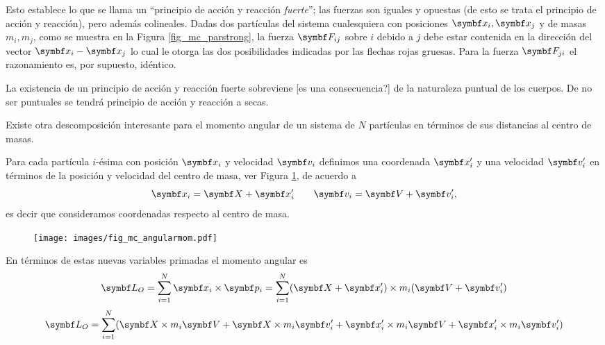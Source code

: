 \documentclass[10pt,oneside]{CBFT_book}
\begin{document}
Esto establece lo que se llama un ``principio de acción y reacción {\it fuerte}''; las fuerzas son iguales y opuestas 
(de esto se trata el principio de acción y reacción), pero además colineales.
Dadas dos partículas del sistema cualesquiera con posiciones $ \vb{x}_i, \vb{x}_j $ y de masas $ m_i, m_j $, como se 
muestra en la Figura \ref{fig_mc_parstrong}, la fuerza $\vb{F}_{ij}$ sobre $i$ debido a $j$ debe estar contenida en la 
dirección del vector $ \vb{x}_i - \vb{x}_j $ lo cual le otorga las dos posibilidades indicadas por las flechas rojas 
gruesas. Para la fuerza $\vb{F}_{ji}$ el razonamiento es, por supuesto, idéntico.


La existencia de un principio de acción y reacción fuerte sobreviene [es una consecuencia?] de la naturaleza puntual de 
los cuerpos. De no ser puntuales se tendrá principio de acción y reacción a secas.

Existe otra descomposición interesante para el momento angular  de un sistema de $N$ partículas en términos de 
sus distancias al centro de masas.

Para cada partícula $i$-ésima con posición $ \vb{x}_i $ y velocidad $ \vb{v}_i $ definimos una coordenada $ \vb{x}_i' $ 
y una velocidad $\vb{v}_i' $ en términos de la posición  y velocidad  del centro de masa, ver Figura 
\ref{fig_mc_angularmom}, de acuerdo a
\[
	\vb{x}_i = \vb{X} + \vb{x}_i' \qquad \vb{v}_i = \vb{V} + \vb{v}_i',
\]
es decir que consideramos coordenadas respecto al centro de masa.

\begin{figure}[hbt]
	\begin{center}
	\texttt{[image: images/fig\_mc\_angularmom.pdf]}	
	\end{center}
	\caption{}
	\label{fig_mc_angularmom}
\end{figure} 


En términos de estas nuevas variables primadas el momento angular es
\[
	\vb{L}_O = \Sum{i=1}{N} \vb{x}_i \times \vb{p}_i = 
	\Sum{i=1}{N} (\vb{X} + \vb{x}_i') \times m_i (\vb{V} + \vb{v}_i')
\]
\[
	\vb{L}_O = \Sum{i=1}{N} ( \vb{X} \times m_i \vb{V}  + \vb{X} \times m_i \vb{v}_i'
	+ \vb{x}_i' \times m_i \vb{V} 	+ \vb{x}_i' \times m_i \vb{v}_i' )
\]
\end{document}
